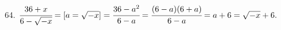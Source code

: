 64. $\cfrac{36+x}{6-\sqrt{-x}}=[a=\sqrt{-x}]=\cfrac{36-a^2}{6-a}=\cfrac{(6-a)(6+a)}{6-a}=a+6=\sqrt{-x}+6.$\\

